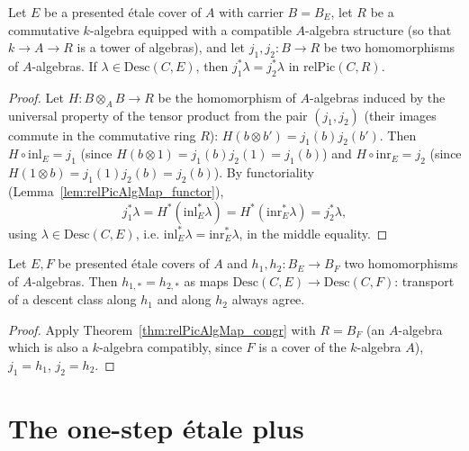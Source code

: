 \begin{theorem}
  \label{thm:relPicAlgMap_congr}
  \leanok
  Let \(E\) be a presented \'etale cover of \(A\) with carrier \(B = B_E\), let \(R\) be a
  commutative \(k\)-algebra equipped with a compatible \(A\)-algebra structure (so that
  \(k \to A \to R\) is a tower of algebras), and let \(j_1, j_2 \colon B \to R\) be two
  homomorphisms of \(A\)-algebras. If \(\lambda \in \mathrm{Desc}(C,E)\), then
  \(j_1^{*}\lambda = j_2^{*}\lambda\) in \(\mathrm{relPic}(C,R)\).
\end{theorem}
\begin{proof}
  \leanok
  Let \(H \colon B \otimes_A B \to R\) be the homomorphism of \(A\)-algebras induced by the
  universal property of the tensor product from the pair \((j_1, j_2)\) (their images commute
  in the commutative ring \(R\)): \(H(b \otimes b') = j_1(b) j_2(b')\). Then
  \(H \circ \mathrm{inl}_E = j_1\) (since \(H(b \otimes 1) = j_1(b) j_2(1) = j_1(b)\)) and
  \(H \circ \mathrm{inr}_E = j_2\) (since \(H(1 \otimes b) = j_1(1) j_2(b) = j_2(b)\)). By
  functoriality (Lemma~\ref{lem:relPicAlgMap_functor}),
  \[
    j_1^{*}\lambda = H^{*}(\mathrm{inl}_E^{*}\lambda) = H^{*}(\mathrm{inr}_E^{*}\lambda)
    = j_2^{*}\lambda,
  \]
  using \(\lambda \in \mathrm{Desc}(C,E)\), i.e. \(\mathrm{inl}_E^{*}\lambda =
  \mathrm{inr}_E^{*}\lambda\), in the middle equality.
\end{proof}

\begin{theorem}
  \label{thm:descentMap_congr}
  \leanok
  Let \(E, F\) be presented \'etale covers of \(A\) and \(h_1, h_2 \colon B_E \to B_F\) two
  homomorphisms of \(A\)-algebras. Then \(h_{1,*} = h_{2,*}\) as maps
  \(\mathrm{Desc}(C,E) \to \mathrm{Desc}(C,F)\): transport of a descent class along \(h_1\) and
  along \(h_2\) always agree.
\end{theorem}
\begin{proof}
  \leanok
  Apply Theorem~\ref{thm:relPicAlgMap_congr} with \(R = B_F\) (an \(A\)-algebra which is also a
  \(k\)-algebra compatibly, since \(F\) is a cover of the \(k\)-algebra \(A\)), \(j_1 = h_1\),
  \(j_2 = h_2\).
\end{proof}

\section{The one-step \'etale plus}

